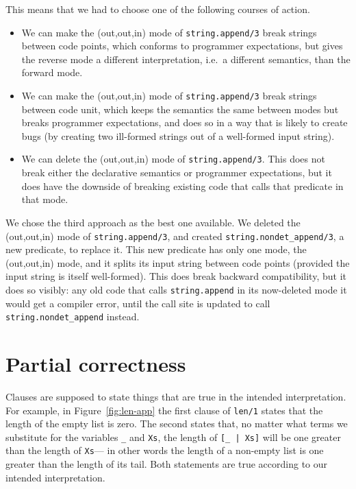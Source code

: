 This means that we had to choose one of the following courses of action.
\begin{itemize}
\item
We can make the (out,out,in) mode of \texttt{string.append/3}
break strings between code points,
which conforms to programmer expectations,
but gives the reverse mode a different interpretation,
i.e.\ a different semantics, than the forward mode.
\item
We can make the (out,out,in) mode of \texttt{string.append/3}
break strings between code unit,
which keeps the semantics the same between modes
but breaks programmer expectations,
and does so in a way that is likely to create bugs
(by creating two ill-formed strings out of a well-formed input string).
\item
We can delete the (out,out,in) mode of \texttt{string.append/3}.
This does not break either the declarative semantics
or programmer expectations,
but it does have the downside of breaking existing code
that calls that predicate in that mode.
\end{itemize}

We chose the third approach as the best one available.
We deleted the (out,out,in) mode of \texttt{string.append/3},
and created \texttt{string.nondet\_append/3}, a new predicate,
to replace it.
This new predicate has only one mode, the (out,out,in) mode,
and it splits its input string between code points
(provided the input string is itself well-formed).
This does break backward compatibility, but it does so visibly:
any old code that calls \texttt{string.append}
in its now-deleted mode it would get a compiler error,
until the call site is updated to call \texttt{string.nondet\_append} instead.



\section{Partial correctness}
\label{sec:partial-correctness}

Clauses are supposed to state things that are
true in the intended interpretation.
For example,
in Figure~\ref{fig:len-app}
the first clause of \texttt{len/1} states that
the length of the empty list is zero.
The second states that,
no matter what terms we substitute
for the variables \texttt{\_} and \texttt{Xs},
the length of \texttt{[\_~|~Xs]} will be one greater than
the length of \texttt{Xs}---%
in other words the length of a non-empty list
is one greater than the length of its tail.
Both statements are true
according to our intended interpretation.

